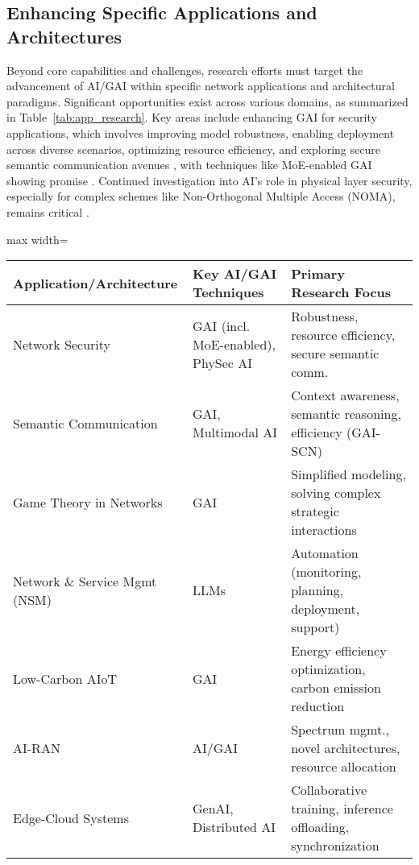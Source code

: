 \documentclass[sigconf]{acmart}
\begin{document}
\subsection{Enhancing Specific Applications and Architectures}

Beyond core capabilities and challenges, research efforts must target the advancement of AI/GAI within specific network applications and architectural paradigms. Significant opportunities exist across various domains, as summarized in Table~\ref{tab:app_research}. Key areas include enhancing GAI for security applications, which involves improving model robustness, enabling deployment across diverse scenarios, optimizing resource efficiency, and exploring secure semantic communication avenues \cite{ref5}, with techniques like MoE-enabled GAI showing promise \cite{ref20}. Continued investigation into AI's role in physical layer security, especially for complex schemes like Non-Orthogonal Multiple Access (NOMA), remains critical \cite{ref30}.

\begin{table*}[htbp]
\centering
\caption{Selected AI/GAI Research Thrusts in Specific Telecommunication Applications and Architectures}
\label{tab:app_research}
\begin{adjustbox}{max width=\textwidth}
\begin{tabular}{lll}
\hline
\textbf{Application/Architecture} & \textbf{Key AI/GAI Techniques} & \textbf{Primary Research Focus} \\ \hline
Network Security & GAI (incl. MoE-enabled), PhySec AI & Robustness, resource efficiency, secure semantic comm. \cite{ref5, ref20, ref30} \\
Semantic Communication & GAI, Multimodal AI & Context awareness, semantic reasoning, efficiency (GAI-SCN) \cite{ref23} \\
Game Theory in Networks & GAI & Simplified modeling, solving complex strategic interactions \cite{ref21} \\
Network \& Service Mgmt (NSM) & LLMs & Automation (monitoring, planning, deployment, support) \cite{ref25} \\
Low-Carbon AIoT & GAI & Energy efficiency optimization, carbon emission reduction \cite{ref29} \\
AI-RAN & AI/GAI & Spectrum mgmt., novel architectures, resource allocation \cite{ref34} \\
Edge-Cloud Systems & GenAI, Distributed AI & Collaborative training, inference offloading, synchronization \cite{ref3, ref14, ref31} \\ \hline
\end{tabular}
\end{adjustbox}
\end{table*}
\end{document}
